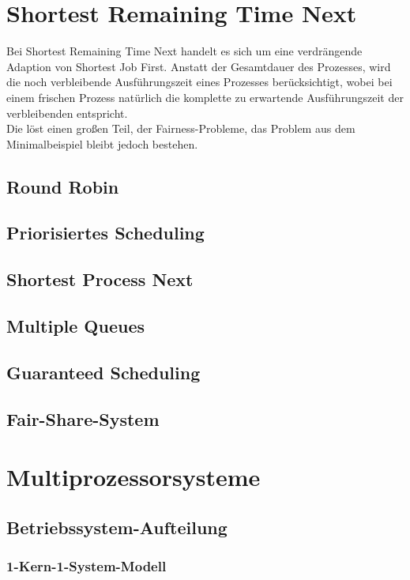 \section{Shortest Remaining Time Next}
Bei Shortest Remaining Time Next handelt es sich um eine verdrängende Adaption von Shortest Job First.  
Anstatt der Gesamtdauer des Prozesses, wird die noch verbleibende Ausführungszeit eines Prozesses berücksichtigt, wobei bei einem frischen Prozess natürlich die komplette zu erwartende Ausführungszeit der verbleibenden entspricht. \\
Die löst einen großen Teil, der Fairness-Probleme, das Problem aus dem Minimalbeispiel bleibt jedoch bestehen. \\

\subsection{Round Robin}
\subsection{Priorisiertes Scheduling}
\subsection{Shortest Process Next}
\subsection{Multiple Queues}
\subsection{Guaranteed Scheduling}
\subsection{Fair-Share-System}
\section{Multiprozessorsysteme}
\subsection{Betriebssystem-Aufteilung}
\subsubsection{1-Kern-1-System-Modell}

